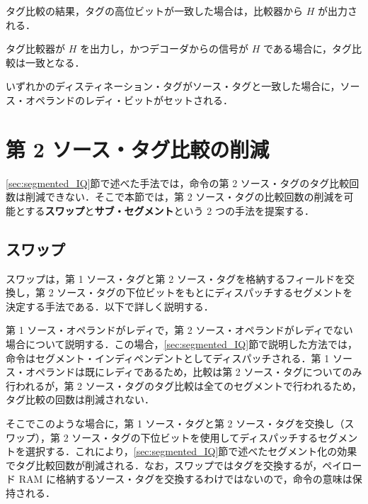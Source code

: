 タグ比較の結果，タグの高位ビットが一致した場合は，比較器から $H$ が出力される．

タグ比較器が $H$ を出力し，かつデコーダからの信号が $H$ である場合に，タグ比較は一致となる．

いずれかのディスティネーション・タグがソース・タグと一致した場合に，ソース・オペランドのレディ・ビットがセットされる．


\section{第 2 ソース・タグ比較の削減}
\label{sec:second_tag_comp}
\ref{sec:segmented_IQ}節で述べた手法では，命令の第 2 ソース・タグのタグ比較回数は削減できない．そこで本節では，第 2 ソース・タグの比較回数の削減を可能とする\textbf{スワップ}と\textbf{サブ・セグメント}という 2 つの手法を提案する．

\subsection{スワップ}
\label{sec:swap}
スワップは，第 1 ソース・タグと第 2 ソース・タグを格納するフィールドを交換し，第 2 ソース・タグの下位ビットをもとにディスパッチするセグメントを決定する手法である．以下で詳しく説明する．

第 1 ソース・オペランドがレディで，第 2 ソース・オペランドがレディでない場合について説明する．この場合，\ref{sec:segmented_IQ}節で説明した方法では，命令はセグメント・インディペンデントとしてディスパッチされる．第 1 ソース・オペランドは既にレディであるため，比較は第 2 ソース・タグについてのみ行われるが，第 2  ソース・タグのタグ比較は全てのセグメントで行われるため，タグ比較の回数は削減されない．

そこでこのような場合に，第 1 ソース・タグと第 2 ソース・タグを交換し（スワップ），第 2 ソース・タグの下位ビットを使用してディスパッチするセグメントを選択する．これにより，\ref{sec:segmented_IQ}節で述べたセグメント化の効果でタグ比較回数が削減される．なお，スワップではタグを交換するが，ペイロード RAM に格納するソース・タグを交換するわけではないので，命令の意味は保持される．

